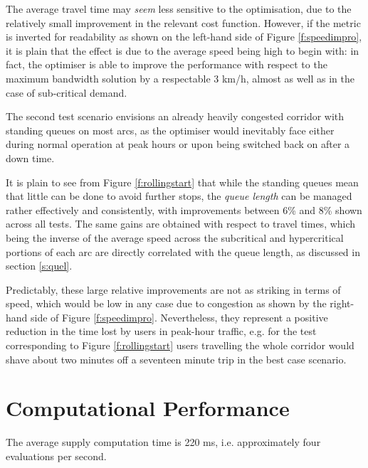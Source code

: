 The average travel time may \emph{seem} less sensitive to the optimisation, due to the relatively small improvement in the relevant cost function. However, if the metric is inverted for readability as shown on the left-hand side of Figure \ref{f:speedimpro}, it is plain that the effect is due to the average speed being high to begin with: in fact, the optimiser is able to improve the performance with respect to the maximum bandwidth solution by a respectable 3 km/h, almost as well as in the case of sub-critical demand.


The second test scenario envisions an already heavily congested  corridor with standing queues on most arcs, as the optimiser would inevitably face either during normal operation at peak hours or upon being switched back on after a down time. 

It is plain to see from Figure \ref{f:rollingstart} that while the standing queues mean that little can be done to avoid further stops, the \emph{queue length} can be managed rather effectively and consistently, with improvements between 6\% and 8\% shown across all tests. The same gains are obtained with respect to travel times, which being the inverse of the average speed across the subcritical and hypercritical portions of each arc are directly correlated with the queue length, as discussed in section \ref{s:quel}.

Predictably, these large relative improvements are not as striking in terms of speed, which would be low in any case due to congestion as shown by the right-hand side of Figure \ref{f:speedimpro}. Nevertheless, they represent a positive reduction in the time lost by users in peak-hour traffic, e.g. for the test corresponding to Figure \ref{f:rollingstart} users travelling the whole corridor would shave about two minutes off a seventeen minute trip in the best case scenario.



\section{Computational Performance}

The average supply computation time is 220 ms, i.e. approximately four evaluations per second.



